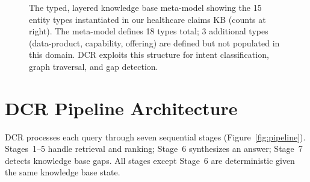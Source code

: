 \documentclass[11pt,a4paper]{article}
\begin{document}
\begin{figure}[t]
\caption{The typed, layered knowledge base meta-model showing the 15 entity types instantiated in our healthcare claims KB (counts at right). The meta-model defines 18 types total; 3 additional types (data-product, capability, offering) are defined but not populated in this domain. DCR exploits this structure for intent classification, graph traversal, and gap detection.}
\label{fig:ontology}
\end{figure}

\section{DCR Pipeline Architecture}
\label{sec:pipeline}

DCR processes each query through seven sequential stages (Figure~\ref{fig:pipeline}). Stages~1--5 handle retrieval and ranking; Stage~6 synthesizes an answer; Stage~7 detects knowledge base gaps. All stages except Stage~6 are deterministic given the same knowledge base state.
\end{document}
